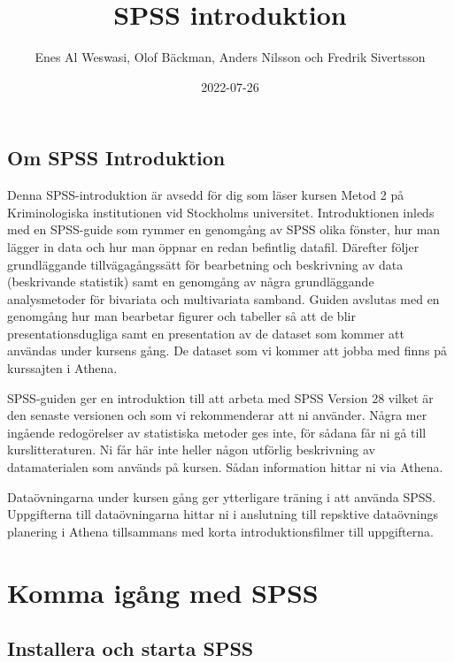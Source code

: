 \documentclass[
]{book}
\title{SPSS introduktion}
\author{Enes Al Weswasi, Olof Bäckman, Anders Nilsson och Fredrik Sivertsson}
\date{2022-07-26}
\begin{document}
\maketitle

{
\hypersetup{linkcolor=}
\setcounter{tocdepth}{1}
\tableofcontents
}
\hypertarget{om-spss-introduktion}{%
\chapter*{Om SPSS Introduktion}\label{om-spss-introduktion}}

Denna SPSS-introduktion är avsedd för dig som läser kursen Metod 2 på Kriminologiska institutionen vid Stockholms universitet. Introduktionen inleds med en SPSS-guide som rymmer en genomgång av SPSS olika fönster, hur man lägger in data och hur man öppnar en redan befintlig datafil. Därefter följer grundläggande tillvägagångssätt för bearbetning och beskrivning av data (beskrivande statistik) samt en genomgång av några grundläggande analysmetoder för bivariata och multivariata samband. Guiden avslutas med en genomgång hur man bearbetar figurer och tabeller så att de blir presentationsdugliga samt en presentation av de dataset som kommer att användas under kursens gång. De dataset som vi kommer att jobba med finns på kurssajten i Athena.

SPSS-guiden ger en introduktion till att arbeta med SPSS Version 28 vilket är den senaste versionen och som vi rekommenderar att ni använder. Några mer ingående redogörelser av statistiska metoder ges inte, för sådana får ni gå till kurslitteraturen. Ni får här inte heller någon utförlig beskrivning av datamaterialen som används på kursen. Sådan information hittar ni via Athena.

Dataövningarna under kursen gång ger ytterligare träning i att använda SPSS. Uppgifterna till dataövningarna hittar ni i anslutning till repsktive dataövnings planering i Athena tillsammans med korta introduktionsfilmer till uppgifterna.

\hypertarget{part-komma-iguxe5ng-med-spss}{%
\part*{Komma igång med SPSS}\label{part-komma-iguxe5ng-med-spss}}

\hypertarget{installera-och-starta-spss}{%
\chapter{Installera och starta SPSS}\label{installera-och-starta-spss}}
\end{document}
